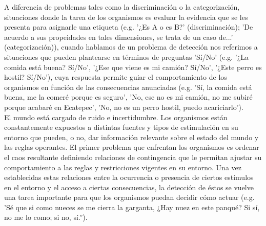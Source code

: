A diferencia de problemas tales como la discriminación o la categorización, situaciones donde la tarea de los organismos es evaluar la evidencia que se les presenta para asignarle una etiqueta (e.g. '¿Es A o es B?' (discriminación); 'De acuerdo a sus propeidades en tales dimensiones, se trata de un caso de...' (categorización)), cuando hablamos de un problema de detección nos referimos a situaciones que pueden plantearse en términos de preguntas 'Sí/No' (e.g. '¿La comida está buena? Sí/No', '¿Ese que viene es mi camión? Sí/No', '¿Este perro es hostil? Sí/No'), cuya respuesta permite guiar el comportamiento de los organismos en función de las consecuencias anunciadas (e.g. 'Sí, la comida está buena, me la comeré porque es seguro', 'No, ese no es mi camión, no me subiré porque acabaré en Ecatepec', 'No, no es un perro hostil, puedo acariciarlo').\\ 

El mundo está cargado de ruido e incertidumbre. Los organismos están constantemente expuestos a distintas fuentes y tipos de estimulación en su entorno que pueden, o no, dar información relevante sobre el estado del mundo y las reglas operantes. El primer problema que enfrentan los organismos es ordenar el caos resultante definiendo relaciones de contingencia que le permitan ajustar su comportamiento a las reglas y restricciones vigentes en su entorno. Una vez establecidas estas relaciones entre la ocurrencia o presencia de ciertos estímulos en el entorno y el acceso a ciertas consecuencias, la detección de éstos se vuelve una tarea importante para que los organismos puedan decidir cómo actuar (e.g. 'Sé que si como nueces se me cierra la garganta, ¿Hay nuez en este panqué? Si sí, no me lo como; si no, sí.'').\\

